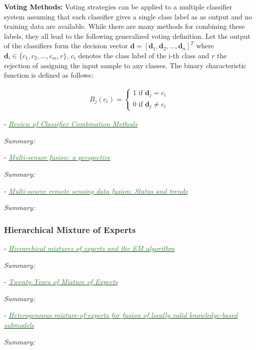 \documentclass[]{article}
\newcommand{\paperentry}[4]{
            \hangindent=1cm
            \cite{#1} - \href{run:../References/#3}{\textcolor{ForestGreen}{\textit{#2}}}
            
            \noindent            
            \begin{minipage}[t]{0.1\linewidth}\hfill\end{minipage}
            \begin{minipage}[t]{0.8\linewidth}\textcolor{NavyBlue}{{\textit{Summary:}}}#4\end{minipage}
            \vspace{.25cm}
          }
\begin{document}
			\noindent
			\textbf{Voting Methods:} \newline Voting strategies can be applied to a multiple classifier system assuming that each classifier gives a single class label as as output and no training data are available.  While there are many methods for combining these labels, they all lead to the following generalized voting definition.  Let the output of the classifiers form the decision vector $\bm{d} = [ \bm{d}_1, \bm{d}_2, \dots, \bm{d}_n ]^{T}$ where $\bm{d}_i \in \{ c_1, c_2, \dots, c_m, r \} $, $c_i$ denotes the class label of the i-th class and $r$ the rejection of assigning the input sample to any classes.  The binary characteristic function is defined as follows:
			
			\begin{align*}
				B_{j}(c_i) = \begin{cases}
				1 \text{ if } \bm{d}_j = c_i \\
				0 \text{ if } \bm{d}_j \neq c_i 
				\end{cases}
			\end{align*}
			
			
			
			
			\paperentry{Tulyakov2008ReviewClassifierCombinationMethods}
			{Review of Classifier Combination Methods}
			{Fusion/Reviews/Tulyakov2008ReviewClassifierCombinationMethods.pdf}
			{}
			
			\paperentry{hackett1990multisensorfusion}
			{Multi-sensor fusion: a perspective}
			{Fusion/Reviews/hackett1990multisensorfusion.pdf}
			{}
			
			\paperentry{zhang2010multisourceremotingsensingfusion}
			{Multi-source remote sensing data fusion: Status and trends}
			{Fusion/Reviews/zhang2010multisourceremotingsensingfusion.pdf}
			{}
		
	
		\subsubsection{Hierarchical Mixture of Experts}
		
			\paperentry{Jordan1993HME}
			{Hierarchical mixtures of experts and the EM algorithm}
			{Fusion/HME/Jordan1993HME.pdf}
			{}
		
			\paperentry{Yuksel2012TwentyYearsMixtureofExperts}
			{Twenty Years of Mixture of Experts}
			{Fusion/HME/Yuksel2012TwentyYearsMixtureofExperts.pdf}
			{}
			
			\paperentry{Beyer2009HeterogeneousMixtureOfExperts}
			{Heterogeneous mixture-of-experts for fusion of locally valid knowledge-based submodels}
			{Fusion/HME/Beyer2009HeterogeneousMixtureOfExperts.pdf}
			{}
			
\end{document}
